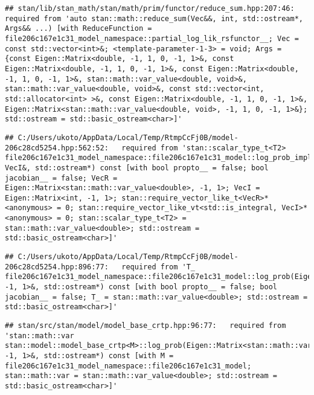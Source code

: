 \documentclass[
]{article}
\begin{document}
\begin{verbatim}
## stan/lib/stan_math/stan/math/prim/functor/reduce_sum.hpp:207:46:   required from 'auto stan::math::reduce_sum(Vec&&, int, std::ostream*, Args&& ...) [with ReduceFunction = file206c167e1c31_model_namespace::partial_log_lik_rsfunctor__; Vec = const std::vector<int>&; <template-parameter-1-3> = void; Args = {const Eigen::Matrix<double, -1, 1, 0, -1, 1>&, const Eigen::Matrix<double, -1, 1, 0, -1, 1>&, const Eigen::Matrix<double, -1, 1, 0, -1, 1>&, stan::math::var_value<double, void>&, stan::math::var_value<double, void>&, const std::vector<int, std::allocator<int> >&, const Eigen::Matrix<double, -1, 1, 0, -1, 1>&, Eigen::Matrix<stan::math::var_value<double, void>, -1, 1, 0, -1, 1>&}; std::ostream = std::basic_ostream<char>]'
\end{verbatim}

\begin{verbatim}
## C:/Users/ukoto/AppData/Local/Temp/RtmpCcFj0B/model-206c28cd5254.hpp:562:52:   required from 'stan::scalar_type_t<T2> file206c167e1c31_model_namespace::file206c167e1c31_model::log_prob_impl(VecR&, VecI&, std::ostream*) const [with bool propto__ = false; bool jacobian__ = false; VecR = Eigen::Matrix<stan::math::var_value<double>, -1, 1>; VecI = Eigen::Matrix<int, -1, 1>; stan::require_vector_like_t<VecR>* <anonymous> = 0; stan::require_vector_like_vt<std::is_integral, VecI>* <anonymous> = 0; stan::scalar_type_t<T2> = stan::math::var_value<double>; std::ostream = std::basic_ostream<char>]'
\end{verbatim}

\begin{verbatim}
## C:/Users/ukoto/AppData/Local/Temp/RtmpCcFj0B/model-206c28cd5254.hpp:896:77:   required from 'T_ file206c167e1c31_model_namespace::file206c167e1c31_model::log_prob(Eigen::Matrix<T_job_param, -1, 1>&, std::ostream*) const [with bool propto__ = false; bool jacobian__ = false; T_ = stan::math::var_value<double>; std::ostream = std::basic_ostream<char>]'
\end{verbatim}

\begin{verbatim}
## stan/src/stan/model/model_base_crtp.hpp:96:77:   required from 'stan::math::var stan::model::model_base_crtp<M>::log_prob(Eigen::Matrix<stan::math::var_value<double>, -1, 1>&, std::ostream*) const [with M = file206c167e1c31_model_namespace::file206c167e1c31_model; stan::math::var = stan::math::var_value<double>; std::ostream = std::basic_ostream<char>]'
\end{verbatim}
\end{document}
